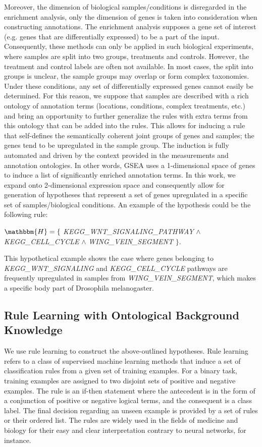 \documentclass{bmcart}
\begin{document}
Moreover, the dimension of biological samples/conditions is disregarded in the enrichment analysis, only the dimension of genes is taken into consideration when constructing annotations. The enrichment analysis supposes a gene set of interest (e.g. genes that are differentially expressed) to be a part of the input. Consequently, these methods can only be applied in such biological experiments, where samples are split into two groups, treatments and controls. However, the treatment and control labels are often not available. In most cases, the split into groups is unclear, the sample groups may overlap or form complex taxonomies. Under these conditions, any set of differentially expressed genes cannot easily be determined. For this reason, we suppose that samples are described with a rich ontology of annotation terms (locations, conditions, complex treatments, etc.) and bring an opportunity to further generalize the rules with extra terms from this ontology that can be added into the rules. This allows for inducing a rule that self-defines the semantically coherent joint groups of genes and samples; the genes tend to be upregulated in the sample group. The induction is fully automated and driven by the context provided in the measurements and annotation ontologies. In other words, GSEA uses a 1-dimensional space of genes to induce a list of significantly enriched annotation terms. In this work, we expand onto 2-dimensional expression space and consequently allow for generation of hypotheses that represent a set of genes upregulated in a specific set of samples/biological conditions. An example of the hypothesis could be the following rule:
\begin{center}
$\mathbbm{H}= \{$ \emph{KEGG\_WNT\_SIGNALING\_PATHWAY} $\wedge$ \emph{KEGG\_CELL\_CYCLE}  $\wedge$ \emph{WING\_VEIN\_SEGMENT} $\}$.
\end{center}
This hypothetical example shows the case where genes belonging to \emph{KEGG\_WNT\_SIGNALING} and \emph{KEGG\_CELL\_CYCLE} pathways are frequently upregulated in samples from \emph{WING\_VEIN\_SEGMENT}, which makes a specific body part of Drosophila melanogaster. 

\subsection*{Rule Learning with Ontological Background Knowledge}

We use rule learning \cite{fuerkranz2012rules,kotsiantis2007supervised} to construct the above-outlined hypotheses. Rule learning refers to a class of supervised machine learning methods that induce a set of classification rules from a given set of training examples. For a binary task, training examples are assigned to two disjoint sets of positive and negative examples. The rule is an if-then statement where the antecedent is in the form of a conjunction of positive or negative logical terms, and the consequent is a class label. The final decision regarding an unseen example is provided by a set of rules or their ordered list. The rules are widely used in the fields of medicine and biology for their easy and clear interpretation \cite{hvidsten2003learning,calzone2006machine,bellazzi2008predictive} contrary to neural networks, for instance. 
\end{document}
